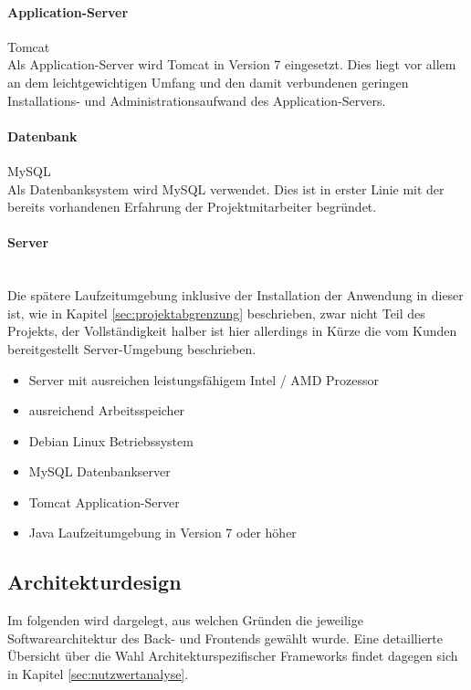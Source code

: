 \documentclass[12pt, xcolor=dvipsnames]{scrartcl}
\begin{document}
\paragraph{Application-Server} Tomcat \\
Als Application-Server wird Tomcat in Version 7 eingesetzt. Dies liegt vor allem an dem leichtgewichtigen Umfang und den damit verbundenen geringen Installations- und Administrationsaufwand des Application-Servers. 

\paragraph{Datenbank} MySQL \\
Als Datenbanksystem wird MySQL verwendet. Dies ist in erster Linie mit der bereits vorhandenen Erfahrung der Projektmitarbeiter begründet.

\paragraph{Server} ~\\
\label{par:zielplattform_server}%
Die spätere Laufzeitumgebung inklusive der Installation der Anwendung in dieser ist, wie in Kapitel \ref{sec:projektabgrenzung} beschrieben, zwar nicht Teil des Projekts, der Vollständigkeit halber ist hier allerdings in Kürze die vom Kunden bereitgestellt Server-Umgebung beschrieben.
\begin{itemize}
	\item Server mit ausreichen leistungsfähigem Intel / AMD Prozessor
	\item ausreichend Arbeitsspeicher
	\item Debian Linux Betriebssystem
	\item MySQL Datenbankserver
	\item Tomcat Application-Server	
	\item Java Laufzeitumgebung in Version 7 oder höher
\end{itemize}


\subsection{Architekturdesign}

Im folgenden wird dargelegt, aus welchen Gründen die jeweilige Softwarearchitektur des Back- und Frontends gewählt wurde. Eine detaillierte Übersicht über die Wahl Architekturspezifischer Frameworks findet dagegen sich in Kapitel \ref{sec:nutzwertanalyse}. \\
\end{document}
